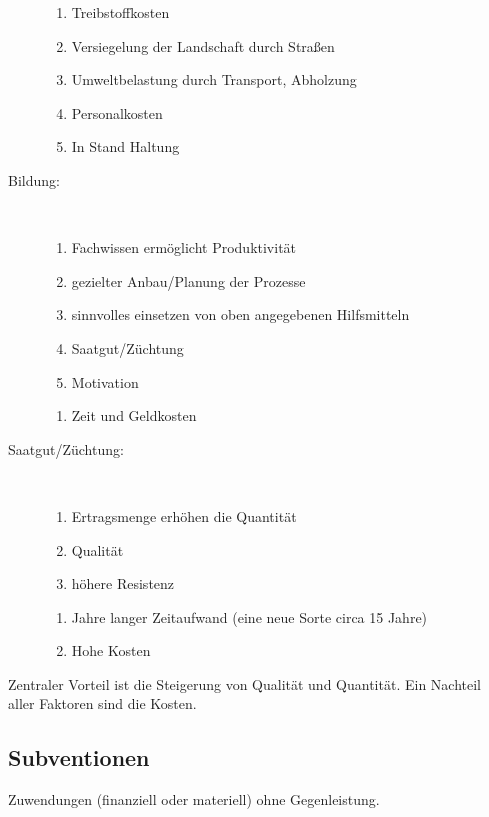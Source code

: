 \begin{description}
\begin{enumerate}[{Pro }1:]
	\end{enumerate}
	\begin{enumerate}[{Kontra }1:]
		\item Treibstoffkosten
		\item Versiegelung der Landschaft durch Straßen
		\item Umweltbelastung durch Transport, Abholzung
		\item Personalkosten
		\item In Stand Haltung
	\end{enumerate}
	\item[Bildung:]~
	\begin{enumerate}[{Pro }1:]
		\item Fachwissen ermöglicht Produktivität
		\item gezielter Anbau/Planung der Prozesse
		\item sinnvolles einsetzen von oben angegebenen Hilfsmitteln
		\item Saatgut/Züchtung
		\item Motivation
	\end{enumerate}
	\begin{enumerate}[{Kontra }1:]
		\item Zeit und Geldkosten
	\end{enumerate}
	\item[Saatgut/Züchtung:]~
	\begin{enumerate}[{Pro }1:]
		\item Ertragsmenge erhöhen die Quantität
		\item Qualität
		\item höhere Resistenz
	\end{enumerate}
	\begin{enumerate}[{Kontra }1:]
		\item Jahre langer Zeitaufwand (eine neue Sorte circa 15 Jahre)
		\item Hohe Kosten
	\end{enumerate}
\end{description}

Zentraler Vorteil ist die Steigerung von Qualität und Quantität.
Ein Nachteil aller Faktoren sind die Kosten.

\subsection{Subventionen}
Zuwendungen (finanziell oder materiell) ohne Gegenleistung.

